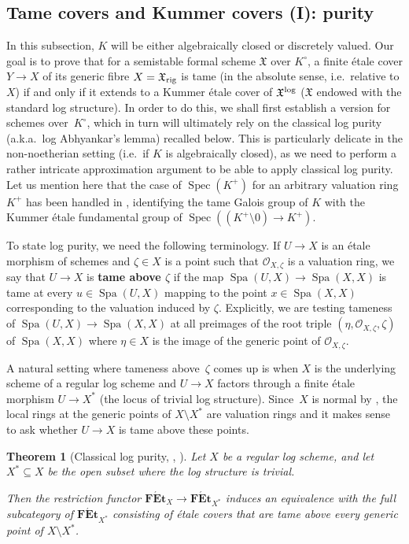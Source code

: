 \documentclass[a4paper,twoside,11pt,reqno]{amsart}
\newcommand{\cO}{{\mathcal O}}
\newcommand{\fX}{{\mathfrak{X}}}
\DeclareMathOperator{\Spec}{Spec}
\DeclareMathOperator{\Spa}{Spa}
\newcommand{\cat}[1]{\mathbf{#1}}
\newcommand{\FEt}{\cat{F\acute{E}t}}
\newcommand{\rig}{{\rm rig}}
\newtheorem{thm}{Theorem}[subsection]
\theoremstyle{definition}
\numberwithin{equation}{subsection}
\begin{document}
\subsection{Tame covers and Kummer covers (I): purity}
\label{ss:log-abhyankar}

In this subsection, $K$ will be either algebraically closed  or 
    discretely valued.
Our goal is to prove that for a semistable formal scheme $\fX$ over $K^\circ$, a finite \'etale cover $Y\to X$ of its generic fibre $X=\fX_{\rig}$ is tame (in the absolute sense, i.e.\ relative to $X$) if and only if it extends to a Kummer \'etale cover of $\fX^{\rm log}$ ($\fX$ endowed with the standard log structure). In order to do this, we shall first establish a version for schemes over~$K^\circ$, which in turn will ultimately rely on the classical log purity (a.k.a.\ log Abhyankar's lemma) recalled below. This is particularly delicate in the non-noetherian setting (i.e.\ if $K$ is algebraically closed), as we need to perform a rather intricate approximation argument to be able to apply classical log purity. Let us mention here that the case of $\Spec(K^+)$ for an arbitrary valuation ring $K^+$ has been handled in \cite[Corollary~4.4.9]{AHLS-Log}, identifying the tame Galois group of $K$ with the Kummer \'etale fundamental group of $\Spec((K^+\setminus 0)\to K^+)$. 

To state log purity, we need the following terminology. If $U\to X$ is an \'etale morphism of schemes and $\zeta\in X$ is a point such that $\cO_{X,\zeta}$ is a valuation ring, we say that $U\to X$ is {\bf tame above $\zeta$} if the map $\Spa(U, X)\to \Spa(X, X)$ is tame at every $u\in \Spa(U, X)$ mapping to the point $x\in \Spa(X, X)$ corresponding to the valuation induced by $\zeta$.
Explicitly, we are testing tameness of $\Spa(U,X) \to \Spa(X,X)$ at all preimages of the root triple $(\eta, \cO_{X,\zeta},\zeta)$ of $\Spa(X,X)$ where $\eta\in X$ is the image of the generic point of $\cO_{X,\zeta}$.

A natural setting where tameness above~$\zeta$ comes up is when $X$ is the underlying scheme of a regular log scheme and $U \to X$ factors through a finite étale morphism $U \to X^*$ (the locus of trivial log structure).
Since~$X$ is normal by \cite[Theorem~4.1]{KatoToricSingularities}, the local rings at the generic points of $X \setminus X^*$ are valuation rings and it makes sense to ask whether $U \to X$ is tame above these points.

\begin{thm}[{Classical log purity, \cite[Theorem~13.3.43]{GabberRameroFoundations}, \cite[Theorem~B]{Mochizuki}}] 
\label{thm:GR-log-Abhyankar}
    Let $X$ be a regular log scheme, and 
    let $X^* \subseteq X$ be the open subset where the log structure is trivial. 
    
    Then the restriction functor $\FEt_X\to \FEt_{X^*}$ induces an equivalence with the full subcategory of $\FEt_{X^*}$ consisting of \'etale covers that are tame above every generic point of $X\setminus X^*$.
\end{thm}
\end{document}
